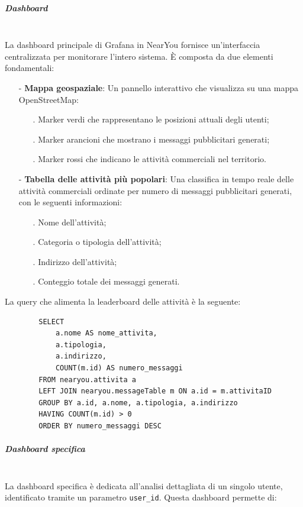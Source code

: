 \documentclass[10pt]{article}
\newcommand{\mysubparagraph}[1]{\subparagraph{#1}\mbox{}\\}
\begin{document}
        \mysubparagraph{Dashboard}
        La dashboard principale di Grafana in NearYou fornisce un'interfaccia centralizzata per monitorare l'intero sistema. È composta da due elementi fondamentali:

        \begin{itemize}
            \item[-] \textbf{Mappa geospaziale}: Un pannello interattivo che visualizza su una mappa OpenStreetMap:
            \begin{itemize}
                \item[.] Marker verdi che rappresentano le posizioni attuali degli utenti;
                \item[.] Marker arancioni che mostrano i messaggi pubblicitari generati;
                \item[.] Marker rossi che indicano le attività commerciali nel territorio.
            \end{itemize}

            \item[-] \textbf{Tabella delle attività più popolari}: Una classifica in tempo reale delle attività commerciali ordinate per numero di messaggi pubblicitari generati, con le seguenti informazioni:
            \begin{itemize}
                \item[.] Nome dell'attività;
                \item[.] Categoria o tipologia dell'attività;
                \item[.] Indirizzo dell'attività;
                \item[.] Conteggio totale dei messaggi generati.
            \end{itemize}
        \end{itemize}

        La query che alimenta la leaderboard delle attività è la seguente:
        \begin{lstlisting}
        SELECT
            a.nome AS nome_attivita,
            a.tipologia,
            a.indirizzo,
            COUNT(m.id) AS numero_messaggi
        FROM nearyou.attivita a
        LEFT JOIN nearyou.messageTable m ON a.id = m.attivitaID
        GROUP BY a.id, a.nome, a.tipologia, a.indirizzo
        HAVING COUNT(m.id) > 0
        ORDER BY numero_messaggi DESC
        \end{lstlisting}

        \mysubparagraph{Dashboard specifica}
        La dashboard specifica è dedicata all'analisi dettagliata di un singolo utente, identificato tramite un parametro \texttt{user\_id}. Questa dashboard permette di:
\end{document}
